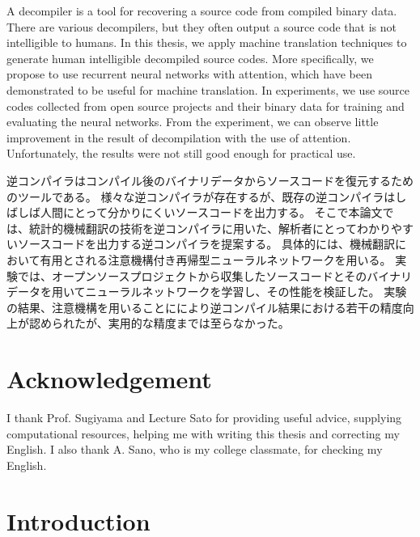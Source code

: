 \documentclass[senior,final,11pt]{iscs-thesis}
\date{December 11, 2018}
\begin{document}
\begin{eabstract}
A decompiler is a tool for recovering a source code from compiled binary data.
There are various decompilers, but they often output a source code that is not intelligible to humans. 
In this thesis, we apply machine translation techniques to generate human intelligible decompiled source codes. 
More specifically, we propose to use recurrent neural networks with attention, 
which have been demonstrated to be useful for machine translation. 
In experiments, we use source codes collected from open source projects and their binary data for training and evaluating the neural networks.
From the experiment, we can observe little improvement in the result of decompilation with the use of attention.
Unfortunately, the results were not still good enough for practical use.

\end{eabstract}
\begin{jabstract}
逆コンパイラはコンパイル後のバイナリデータからソースコードを復元するためのツールである。
様々な逆コンパイラが存在するが、既存の逆コンパイラはしばしば人間にとって分かりにくいソースコードを出力する。
そこで本論文では、統計的機械翻訳の技術を逆コンパイラに用いた、解析者にとってわかりやすいソースコードを出力する逆コンパイラを提案する。
具体的には、機械翻訳において有用とされる注意機構付き再帰型ニューラルネットワークを用いる。
実験では、オープンソースプロジェクトから収集したソースコードとそのバイナリデータを用いてニューラルネットワークを学習し、その性能を検証した。
実験の結果、注意機構を用いることににより逆コンパイル結果における若干の精度向上が認められたが、実用的な精度までは至らなかった。
\end{jabstract}



\maketitle

\chapter*{Acknowledgement}
I thank Prof. Sugiyama and Lecture Sato for providing useful advice, supplying computational resources, helping me with writing this thesis and 
correcting my English.
I also thank A. Sano, who is my college classmate, for checking my English.


\chapter{Introduction}
\end{document}
